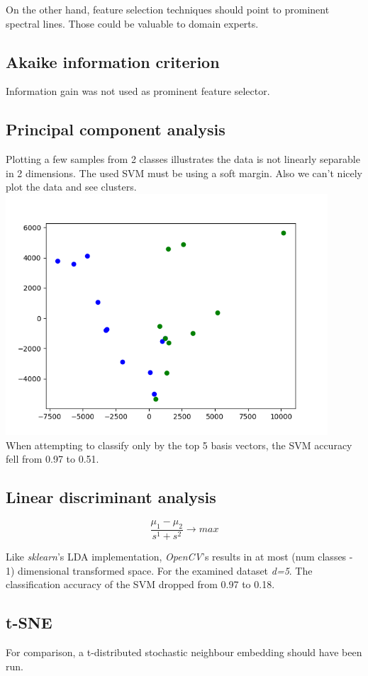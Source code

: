 \documentclass{article}
\begin{document}
On the other hand, feature selection techniques should point to prominent spectral lines.
Those could be valuable to domain experts.


\subsection{Akaike information criterion}
Information gain was not used as prominent feature selector.


\subsection{Principal component analysis}
Plotting a few samples from 2 classes illustrates the data is not linearly separable in 2 dimensions.
The used SVM must be using a soft margin.
Also we can't nicely plot the data and see clusters.
\\
\includegraphics[width=0.9\textwidth]{img/pca}
\\
When attempting to classify only by the top 5 basis vectors, the SVM accuracy fell from 0.97 to 0.51.


\subsection{Linear discriminant analysis}
$$ \frac{ \mu_1 - \mu_2 } { s^1 + s^2 } \to max$$

Like \textit{sklearn}'s LDA implementation, \textit{OpenCV}'s results in at most (num classes - 1) dimensional transformed space.
For the examined dataset \textit{d=5}.
The classification accuracy of the SVM dropped from 0.97 to 0.18.


\subsection{t-SNE}
For comparison, a t-distributed stochastic neighbour embedding should have been run.
\end{document}
